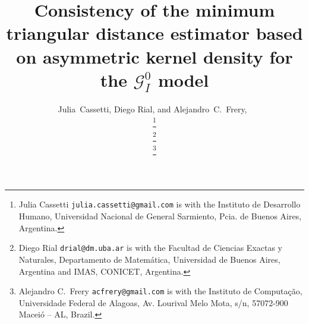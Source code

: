 \documentclass[journal]{IEEEtran}
\numberwithin{equation}{section}
\begin{document}
\title{Consistency of the minimum triangular distance estimator based on asymmetric kernel density for the $\mathcal G_I^0$ model}
\author{ Julia~Cassetti, Diego Rial, and Alejandro~C.~Frery,~


\thanks{Julia Cassetti \texttt{julia.cassetti@gmail.com} is with the  Instituto de Desarrollo Humano, Universidad Nacional de General Sarmiento, Pcia. de Buenos Aires, Argentina.}

\thanks{Diego Rial \texttt{drial@dm.uba.ar} is with the Facultad de Ciencias Exactas y Naturales, Departamento de Matem\'{a}tica, Universidad de Buenos Aires, Argentina and IMAS, CONICET, Argentina.}

\thanks{Alejandro C.\ Frery \texttt{acfrery@gmail.com} is with the Instituto de Computa\c c\~ao, Universidade Federal de Alagoas, 
Av. Lourival Melo Mota, s/n, 57072-900 Macei\'o -- AL, Brazil.} 
}

\maketitle
\end{document}
